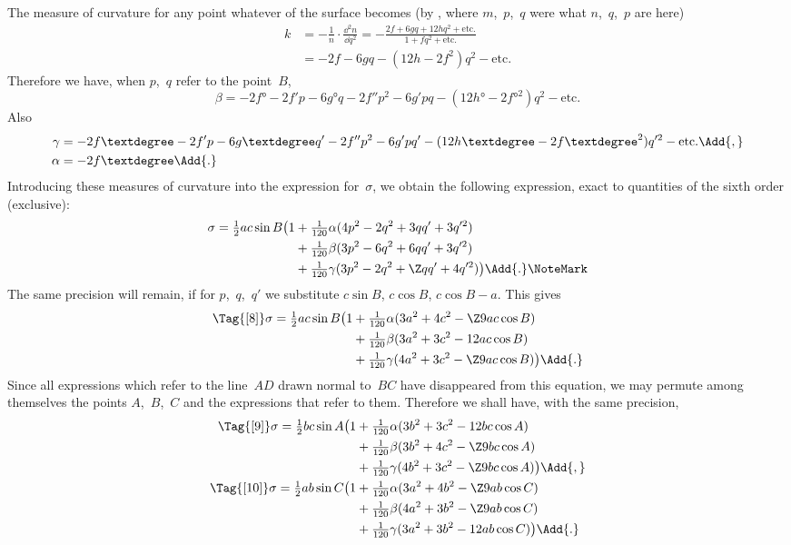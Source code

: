 The measure of curvature for any point whatever of the surface becomes (by ,
where $m$,~$p$,~$q$ were what $n$,~$q$,~$p$ are here)
\begin{align*}
k &= -\frac{1}{n}·\frac{\dd^{2} n}{\dd q^{2}}
   = -\frac{2f + 6gq + 12hq^{2} + \text{etc.}}{1 + fq^{2} + \text{etc.}} \\
  &= -2f - 6gq - (12h - 2f^{2}) q^{2} - \text{etc.}
\end{align*}
Therefore we have, when $p$,~$q$ refer to the point~$B$,
\[
\beta = - 2f° - 2f'p - 6g°q - 2f''p^{2} - 6g'pq - (12h° - 2{f°}^{2})q^{2} - \text{etc.}
\]
Also
\begin{align*}
\gamma &= -2f° - 2f'p - 6g°q' - 2f''p^{2} - 6g'pq' - (12h° - 2{f°}^{2})q'^{2} - \text{etc.}\Add{,} \\
\alpha &= -2f°\Add{.}
\end{align*}
Introducing these measures of curvature into the expression for~$\sigma$, we obtain the following
expression, exact to quantities of the sixth order (exclusive):
\begin{align*}
\sigma = \tfrac{1}{2}ac \sin B
  \bigl(1 &+ \tfrac{1}{120}\alpha(4p^{2} - 2q^{2} + 3qq' + 3q'^{2}) \\
          &+ \tfrac{1}{120}\beta (3p^{2} - 6q^{2} + 6qq' + 3q'^{2}) \\
          &+ \tfrac{1}{120}\gamma(3p^{2} - 2q^{2} + \Z qq' + 4q'^{2})\bigr)\Add{.}\NoteMark
\end{align*}
The same precision will remain, if for $p$,~$q$,~$q'$ we substitute $c\sin B$, $c\cos B$, $c\cos B - a$.
This gives
\begin{align*}
\Tag{[8]}
\sigma = \tfrac{1}{2}ac\sin B
  \bigl(1 &+ \tfrac{1}{120}\alpha(3a^{2} + 4c^{2} - \Z9ac\cos B) \\
          &+ \tfrac{1}{120}\beta (3a^{2} + 3c^{2} -  12ac\cos B) \\
          &+ \tfrac{1}{120}\gamma(4a^{2} + 3c^{2} - \Z9ac\cos B)\bigr)\Add{.}
\end{align*}
Since all expressions which refer to the line~$AD$ drawn normal to~$BC$ have disappeared
from this equation, we may permute among themselves the points $A$,~$B$,~$C$ and
the expressions that refer to them. Therefore we shall have, with the same precision,
\begin{align*}
\Tag{[9]}
\sigma = \tfrac{1}{2}bc\sin A
  \bigl(1 &+ \tfrac{1}{120}\alpha(3b^{2} + 3c^{2} -  12bc\cos A) \\
          &+ \tfrac{1}{120}\beta (3b^{2} + 4c^{2} - \Z9bc\cos A) \\
          &+ \tfrac{1}{120}\gamma(4b^{2} + 3c^{2} - \Z9bc\cos A)\bigr)\Add{,} \\
%
\Tag{[10]}
\sigma = \tfrac{1}{2}ab\sin C
  \bigl(1 &+ \tfrac{1}{120}\alpha(3a^{2} + 4b^{2} - \Z9ab\cos C) \\
          &+ \tfrac{1}{120}\beta (4a^{2} + 3b^{2} - \Z9ab\cos C) \\
          &+ \tfrac{1}{120}\gamma(3a^{2} + 3b^{2} -  12ab\cos C)\bigr)\Add{.}
\end{align*}


